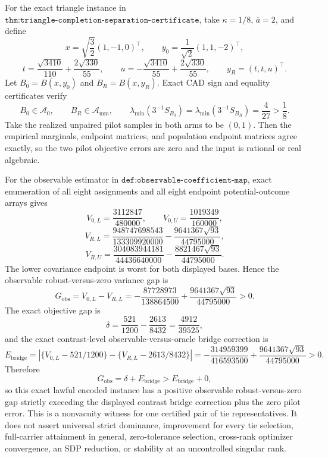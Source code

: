 For the exact triangle instance in \(\texttt{thm:triangle-completion-separation-certificate}\), take \(\kappa=1/8\), \(\overline a=2\), and define
\[
x=\sqrt{\frac32}(1,-1,0)^{\top},
\qquad
y_0=\frac1{\sqrt2}(1,1,-2)^{\top},
\]
\[
t=\frac{\sqrt{3410}}{110}+\frac{2\sqrt{330}}{55},
\qquad
u=-\frac{\sqrt{3410}}{55}+\frac{2\sqrt{330}}{55},
\qquad
y_R=(t,t,u)^{\top}.
\]
Let \(B_0=B(x,y_0)\) and \(B_R=B(x,y_R)\).  Exact CAD sign and equality certificates verify
\[
B_0\in\mathcal A_0,
\qquad
B_R\in\mathcal A_{\mathrm{mm}},
\qquad
\lambda_{\min}(3^{-1}S_{B_0})
=\lambda_{\min}(3^{-1}S_{B_R})=\frac4{27}>\frac18.
\]
Take the realized unpaired pilot samples in both arms to be \((0,1)\).  Then the empirical marginals, endpoint matrices, and population endpoint matrices agree exactly, so the two pilot objective errors are zero and the input is rational or real algebraic.

For the observable estimator in \(\texttt{def:observable-coefficient-map}\), exact enumeration of all eight assignments and all eight endpoint potential-outcome arrays gives
\[
V_{0,L}=\frac{3112847}{480000},
\qquad
V_{0,U}=\frac{1019349}{160000},
\]
\[
V_{R,L}
=\frac{948747698543}{133309920000}
-\frac{9641367\sqrt{93}}{44795000},
\]
\[
V_{R,U}
=\frac{304083944181}{44436640000}
-\frac{8821467\sqrt{93}}{44795000}.
\]
The lower covariance endpoint is worst for both displayed bases.  Hence the observable robust-versus-zero variance gap is
\[
G_{\mathrm{obs}}
=V_{0,L}-V_{R,L}
=-\frac{87728973}{138864500}
+\frac{9641367\sqrt{93}}{44795000}>0.
\]
The exact objective gap is
\[
\delta=\frac{521}{1200}-\frac{2613}{8432}
=\frac{4912}{39525},
\]
and the exact contrast-level observable-versus-oracle bridge correction is
\[
E_{\mathrm{bridge}}
=\left|
\{V_{0,L}-521/1200\}
-\{V_{R,L}-2613/8432\}
\right|
=-\frac{314959399}{416593500}
+\frac{9641367\sqrt{93}}{44795000}>0.
\]
Therefore
\[
G_{\mathrm{obs}}
=\delta+E_{\mathrm{bridge}}
>E_{\mathrm{bridge}}+0,
\]
so this exact lawful encoded instance has a positive observable robust-versus-zero gap strictly exceeding the displayed contrast bridge correction plus the zero pilot error.  This is a nonvacuity witness for one certified pair of tie representatives.  It does not assert universal strict dominance, improvement for every tie selection, full-carrier attainment in general, zero-tolerance selection, cross-rank optimizer convergence, an SDP reduction, or stability at an uncontrolled singular rank.